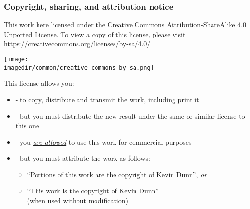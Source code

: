 \documentclass[11pt,aspectratio=169,mathserif]{beamer}
\begin{document}
\begin{frame}\frametitle{Copyright, sharing, and attribution notice}

	{\footnotesize This work here licensed under the Creative Commons Attribution-ShareAlike 4.0 Unported License. To view a copy of this license,
	please visit \href{https://creativecommons.org/licenses/by-sa/4.0/}{https://creativecommons.org/licenses/by-sa/4.0/}}

	\vspace{0.0cm}
	\begin{flushright}
		\texttt{[image: \\imagedir/common/creative-commons-by-sa.png]}
	\end{flushright}
	\vspace{-0.4cm}
	\begin{exampleblock}{}
		{\small This license allows you: }
		\begin{itemize}
			\item	{} - to copy, distribute and transmit the work, including print it
			\item	{} - but you must distribute the new result under the same or similar license to this one
			\item	{} - you \underline{\emph{are allowed}} to use this work for commercial purposes
			\item	{} - but you must attribute the work as follows:
			\begin{itemize}
				\item	``Portions of this work are the copyright of Kevin Dunn'', \emph{or}
				\item	``This work is the copyright of Kevin Dunn'' \\{\tiny (when used without modification)}
			\end{itemize}
		\end{itemize}
	\end{exampleblock}
\end{frame}

\iffalse
\begin{itemize}
	\item   Collapsability sequence
	\item 	Interaction: what is?
	\item 	Tradeoff: 4 factors and 5 expts. But with 8 expts you can docs lot more
	  - tradeoff: uncertainty from materials, people, or equipment.
	  \item   blocking: in the tradeoff table
	\item 	Randomization is important
	\item 	Interaction plots
	\item 	Contour plot concept
	\item 	Disturbance and covariates	
	\item 	Slide 283 for fraction factorial
	\item 	Rsm example walk through, incl slide 521. All models useful
	\item 	Cost approach incl slide 491
	\item 	When things go wrong you have fallback if you had those extra experiments
\end{itemize}
\fi
\end{document}
